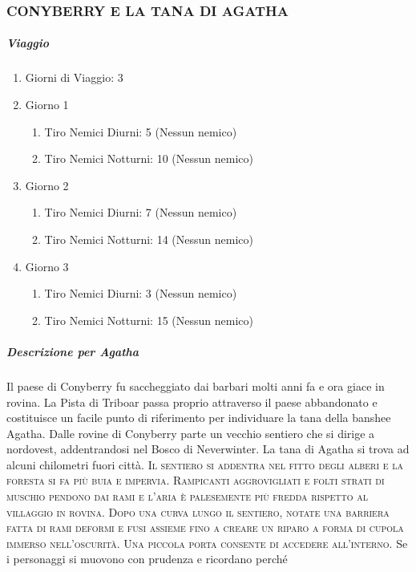 \documentclass{article}
\begin{document}
\subsubsection{CONYBERRY E LA TANA DI
AGATHA}
    \subparagraph{Viaggio} \begin{enumerate}
        \item Giorni di Viaggio: 3
        \item Giorno 1
                \begin{enumerate}
                    \item Tiro Nemici Diurni: 5 (Nessun nemico)
                    \item Tiro Nemici Notturni: 10 (Nessun nemico)
                \end{enumerate}
         \item Giorno 2
                \begin{enumerate}
                    \item Tiro Nemici Diurni: 7 (Nessun nemico)
                    \item Tiro Nemici Notturni: 14 (Nessun nemico)
                \end{enumerate}
         \item Giorno 3
                \begin{enumerate}
                    \item Tiro Nemici Diurni: 3 (Nessun nemico)
                    \item Tiro Nemici Notturni: 15 (Nessun nemico)
                \end{enumerate}
    \end{enumerate}
    \subparagraph{Descrizione per Agatha}Il paese di Conyberry fu saccheggiato dai barbari molti anni
fa e ora giace in rovina. La Pista di Triboar passa proprio
attraverso il paese abbandonato e costituisce un facile punto
di riferimento per individuare la tana della banshee Agatha.
Dalle rovine di Conyberry parte un vecchio sentiero che si
dirige a nordovest, addentrandosi nel Bosco di Neverwinter.
La tana di Agatha si trova ad alcuni chilometri fuori città.
\textsc{Il sentiero si addentra nel fitto degli alberi e la foresta si fa
più buia e impervia. Rampicanti aggrovigliati e folti strati di
muschio pendono dai rami e l’aria è palesemente più fredda
rispetto al villaggio in rovina. Dopo una curva lungo il sentiero,
notate una barriera fatta di rami deformi e fusi assieme fino a
creare un riparo a forma di cupola immerso nell'oscurità. Una
piccola porta consente di accedere all’interno.}
Se i personaggi si muovono con prudenza e ricordano perché
\end{document}
